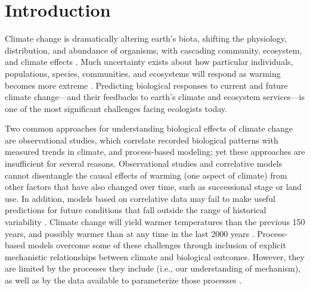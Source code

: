 \documentclass{article}
\begin{document}
 
\section* {Introduction}
\par Climate change is dramatically altering earth's biota, shifting the physiology, distribution, and abundance of organisms, with cascading community, ecosystem, and climate effects \citep{shukla1982,cox2000,thomas2004,parmesan2006,field2007,sheldon2011,urban2012}. Much uncertainty exists about how particular individuals, populations, species, communities, and ecosystems will respond as warming becomes more extreme \citep{thuiller2004,friedlingstein2014}.
Predicting biological responses to current and future climate change---and their feedbacks to earth's climate and ecosystem services---is one of the most significant challenges facing ecologists today.
\par Two common approaches for understanding biological effects of climate change are observational studies, which correlate recorded biological patterns with measured trends in climate, and process-based modeling; yet these approaches are insufficient for several reasons. 
Observational studies and correlative models cannot disentangle the causal effects of warming (one aspect of climate) from other factors that have also changed over time, such as successional stage or land use. In addition, models based on correlative data may fail to make useful predictions for future conditions that fall outside the range of historical variability \citep [e.g.,][]{pearson2004,hampe2004,ibanez2006,swab2012,chuine2016}. Climate change will yield warmer temperatures than the previous 150 years, and possibly warmer than at any time in the last 2000 years \citep{ohlemuller2006,williams2007,williams2007b,ipcc2013}. Process-based models overcome some of these challenges through inclusion of explicit mechanistic relationships between climate and biological outcomes. However, they are limited by the processes they include (i.e., our understanding of mechanism), as well as by the data available to parameterize those processes \citep{moorcroft2006,kearney2009}. 
\end{document}
